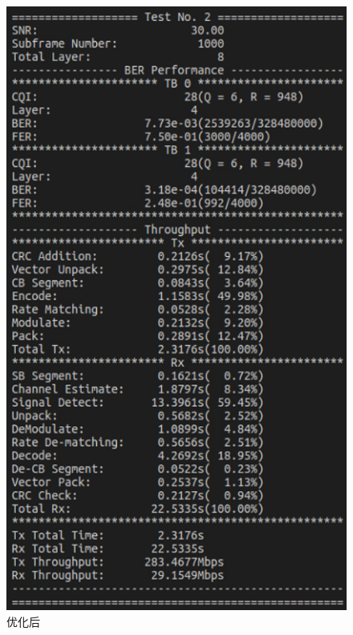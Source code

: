 \documentclass{article}
\begin{document}
\begin{figure}[H]
\begin{minipage}[t]{0.48\textwidth}
		\centering
		\includegraphics[width = \textwidth]{res8.png}
		\caption{优化后}
	\end{minipage}
\end{figure}
\end{document}
